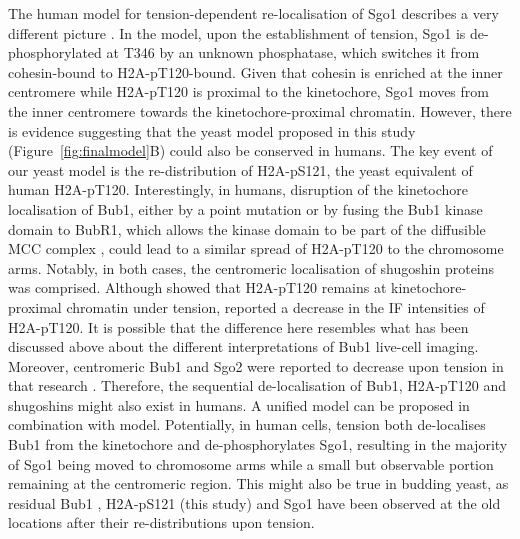 The human model for tension-dependent re-localisation of Sgo1 describes a very different picture \citep{Liu2013a}. In the model, upon the establishment of tension, Sgo1 is de-phosphorylated at T346 by an unknown phosphatase, which switches it from cohesin-bound to H2A-pT120-bound. Given that cohesin is enriched at the inner centromere while H2A-pT120 is proximal to the kinetochore, Sgo1 moves from the inner centromere towards the kinetochore-proximal chromatin. However, there is evidence suggesting that the yeast model proposed in this study (Figure~\ref{fig:finalmodel}B) could also be conserved in humans. The key event of our yeast model is the re-distribution of H2A-pS121, the yeast equivalent of human H2A-pT120. Interestingly, in humans, disruption of the kinetochore localisation of Bub1, either by a point mutation \citep{Asghar2015} or by fusing the Bub1 kinase domain to BubR1, which allows the kinase domain to be part of the diffusible MCC complex \citep{Wang2022SpatialMitosis}, could lead to a similar spread of H2A-pT120 to the chromosome arms. Notably, in both cases, the centromeric localisation of shugoshin proteins was comprised. Although \cite{Liu2013a} showed that H2A-pT120 remains at kinetochore-proximal chromatin under tension, \cite{Asai2020} reported a decrease in the IF intensities of H2A-pT120. It is possible that the difference here resembles what has been discussed above about the different interpretations of Bub1 live-cell imaging. Moreover, centromeric Bub1 and Sgo2 were reported to decrease upon tension in that research \citep{Asai2020}. Therefore, the sequential de-localisation of Bub1, H2A-pT120 and shugoshins might also exist in humans. A unified model can be proposed in combination with \cite{Liu2013a} model. Potentially, in human cells, tension both de-localises Bub1 from the kinetochore and de-phosphorylates Sgo1, resulting in the majority of Sgo1 being moved to chromosome arms while a small but observable portion remaining at the centromeric region. This might also be true in budding yeast, as residual Bub1 \citep{Nerusheva2014, Bokros2021YeastAnaphase}, H2A-pS121 (this study) and Sgo1 \citep{Paldi2020ConvergentPericentromeres} have been observed at the old locations after their re-distributions upon tension. 

